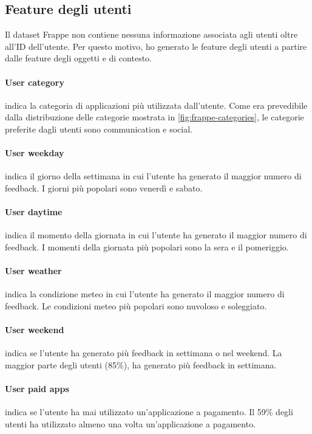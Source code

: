 \documentclass[12pt,italian]{report}
\begin{document}
\subsection{Feature degli utenti}
Il dataset Frappe non contiene nessuna informazione associata agli utenti oltre all'ID dell'utente. Per questo motivo, ho generato le feature degli utenti a partire dalle feature degli oggetti e di contesto.

\paragraph{User category} indica la categoria di applicazioni più utilizzata dall'utente. Come era prevedibile dalla distribuzione delle categorie mostrata in \autoref{fig:frappe-categories}, le categorie preferite dagli utenti sono communication e social.

\paragraph{User weekday} indica il giorno della settimana in cui l'utente ha generato il maggior numero di feedback. I giorni più popolari sono venerdì e sabato.

\paragraph{User daytime} indica il momento della giornata in cui l'utente ha generato il maggior numero di feedback. I momenti della giornata più popolari sono la sera e il pomeriggio.

\paragraph{User weather} indica la condizione meteo in cui l'utente ha generato il maggior numero di feedback. Le condizioni meteo più popolari sono nuvoloso e soleggiato.

\paragraph{User weekend} indica se l'utente ha generato più feedback in settimana o nel weekend. La maggior parte degli utenti (85\%), ha generato più feedback in settimana.

\paragraph{User paid apps} indica se l'utente ha mai utilizzato un'applicazione a pagamento. Il 59\% degli utenti ha utilizzato almeno una volta un'applicazione a pagamento.
\end{document}
